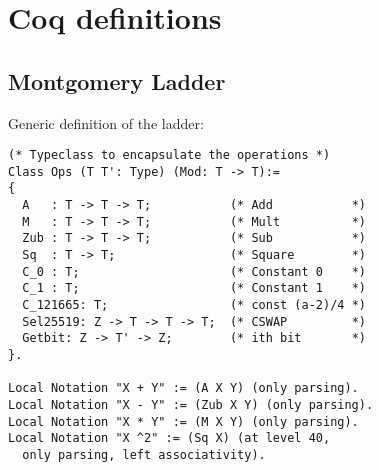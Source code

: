 \section{Coq definitions}
\label{appendix:coq}

\subsection{Montgomery Ladder}
\label{subsubsec:coq-ladder}
Generic definition of the ladder:

\begin{lstlisting}[language=Coq]
(* Typeclass to encapsulate the operations *)
Class Ops (T T': Type) (Mod: T -> T):=
{
  A   : T -> T -> T;           (* Add           *)
  M   : T -> T -> T;           (* Mult          *)
  Zub : T -> T -> T;           (* Sub           *)
  Sq  : T -> T;                (* Square        *)
  C_0 : T;                     (* Constant 0    *)
  C_1 : T;                     (* Constant 1    *)
  C_121665: T;                 (* const (a-2)/4 *)
  Sel25519: Z -> T -> T -> T;  (* CSWAP         *)
  Getbit: Z -> T' -> Z;        (* ith bit       *)
}.

Local Notation "X + Y" := (A X Y) (only parsing).
Local Notation "X - Y" := (Zub X Y) (only parsing).
Local Notation "X * Y" := (M X Y) (only parsing).
Local Notation "X ^2" := (Sq X) (at level 40,
  only parsing, left associativity).


\end{lstlisting}
